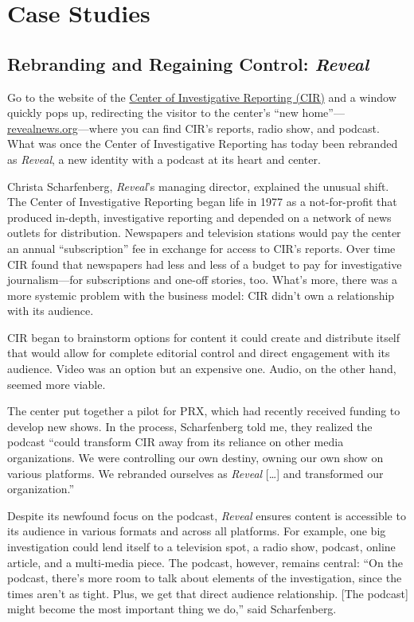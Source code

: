 \documentclass[notoc, symmetric, nobib, nols]{towcenter-guideto-book}
\begin{document}
\chapter{Case Studies}

\section{Rebranding and Regaining Control: \textit{Reveal}}

Go to the website of the \href{http://cironline.org}{Center of Investigative Reporting (CIR)} and a window quickly pops up, redirecting the visitor to the center's ``new home''---\href{https://www.revealnews.org/}{revealnews.org}---where you can find CIR's reports, radio show, and podcast. What was once the Center of Investigative Reporting has today been rebranded as \textit{Reveal}, a new identity with a podcast at its heart and center. 

Christa Scharfenberg, \textit{Reveal}'s managing director, explained the unusual shift. The Center of Investigative Reporting began life in 1977 as a not-for-profit that produced in-depth, investigative reporting and depended on a network of news outlets for distribution. Newspapers and television stations would pay the center an annual ``subscription'' fee in exchange for access to CIR's reports. Over time CIR found that newspapers had less and less of a budget to pay for investigative journalism---for subscriptions and one-off stories, too. What's more, there was a more systemic problem with the business model: CIR didn't own a relationship with its audience.\autocite{reveal}

CIR began to brainstorm options for content it could create and distribute itself that would allow for complete editorial control and direct engagement with its audience. Video was an option but an expensive one. Audio, on the other hand, seemed more viable.\autocite{reveal}

The center put together a pilot for PRX, which had recently received funding to develop new shows. In the process, Scharfenberg told me, they realized the podcast ``could transform CIR away from its reliance on other media organizations. We were controlling our own destiny, owning our own show on various platforms. We rebranded ourselves as \textit{Reveal} […] and transformed our organization.''\autocite{reveal}

Despite its newfound focus on the podcast, \textit{Reveal} ensures content is accessible to its audience in various formats and across all platforms. For example, one big investigation could lend itself to a television spot, a radio show, podcast, online article, and a multi-media piece. The podcast, however, remains central: ``On the podcast, there's more room to talk about elements of the investigation, since the times aren't as tight. Plus, we get that direct audience relationship. [The podcast] might become the most important thing we do,'' said Scharfenberg.\autocite{reveal} 
\end{document}
